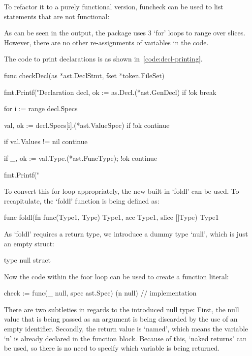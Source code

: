 To refactor it to a purely functional version, funcheck can be used to
list statements that are not functional:

As can be seen in the output, the package uses 3 `for' loops to range over
slices. However, there are no other re-assignments of variables in the code.

The code to print declarations is as shown in~\ref{code:decl-printing}.

\begin{code}
	\label{code:decl-printing}
\begin{gocode}
func checkDecl(as *ast.DeclStmt, fset *token.FileSet) {
	fmt.Printf("Declaration %
	decl, ok := as.Decl.(*ast.GenDecl)
	if !ok {
		break
	}

	for i := range decl.Specs {
		val, ok := decl.Specs[i].(*ast.ValueSpec)
		if !ok {
			continue
		}

		if val.Values != nil {
			continue
		}

		if _, ok := val.Type.(*ast.FuncType); !ok {
			continue
		}

		fmt.Printf("\tIdent %
	}
}
\end{gocode}
\end{code}
To convert this for-loop appropriately, the new built-in `foldl' can be used.
To recapitulate, the `foldl' function is being defined as:
\begin{gocode}
func foldl(fn func(Type1, Type) Type1, acc Type1, slice []Type) Type1
\end{gocode}
As `foldl' requires a return type, we introduce a dummy type `null', which
is just an empty struct:
\begin{gocode}
type null struct{}
\end{gocode}
Now the code within the foor loop can be used to create a function literal:
\begin{gocode}
check := func(_ null, spec ast.Spec) (n null) {
	// implementation
}
\end{gocode}
There are two subtleties in regards to the introduced null type:
First, the null value that is being passed as an argument is being discarded
by the use of an empty identifier.
Secondly, the return value is `named', which means the variable `n' is
already declared in the function block. Because of this, `naked returns' can
be used, so there is no need to specify which variable is being returned.

